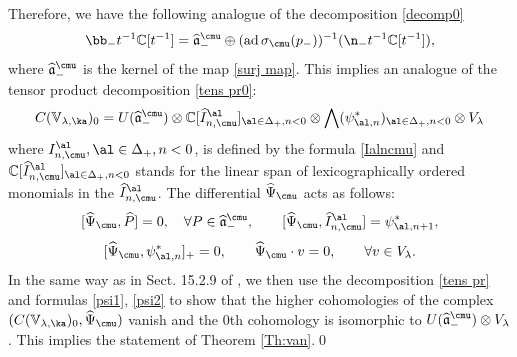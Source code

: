 \documentclass{amsart}
\newcommand{\wh}{\widehat}
\newcommand{\on}{\operatorname}
\newcommand{\+}{\mathop{\oplus}}
\renewcommand{\*}{{\otimes}}
\newcommand{\mf}{\mathfrak}
\newcommand{\mb}{\mathbb}
\newcommand{\C}{\mathbb{C}}
\newcommand{\ra}{\rightarrow}
\newcommand{\lam}{\lambda}
\DeclareMathOperator{\ad}{ad}
\theoremstyle{theorem}
\theoremstyle{remark}
\numberwithin{equation}{section}
\begin{document}
Therefore, we have the following analogue of the decomposition
\eqref{decomp0}
\begin{equation}    \label{decomp}
\bb_- t^{-1}\C[t^{-1}] = \wh{\mathfrak a}^\cmu_- \oplus (\on{ad}
\sigma_\cmu(p_-))^{-1}(\n_- t^{-1} \C[t^{-1}]),
\end{equation}
where $\wh{\mathfrak a}^\cmu_-$ is the kernel of the map \eqref{surj
  map}. This implies an analogue of the tensor product decomposition
\eqref{tens pr0}:
\begin{equation}    \label{tens pr}
C({\mb V}_{\lam,\ka})_0 =
  U(\wh{\mathfrak a}^\cmu_-) \otimes \C[\wh{I}^\al_{n,\cmu}]_{\al \in
    \Delta_+, n<0} \otimes \bigwedge(\psi^*_{\al,n})_{\al \in
    \Delta_+, n<0} \otimes V_\lam
\end{equation}
where $I^\al_{n,\cmu}, \al \in \Delta_+, n<0$, is defined by the
formula \eqref{Ialncmu} and $\C[\wh{I}^\al_{n,\cmu}]_{\al \in
  \Delta_+, n<0}$ stands for the linear span of lexicographically
ordered monomials in the $\wh{I}^\al_{n,\cmu}$. The differential
$\wh\Psi_\cmu$ acts as follows:
\begin{equation}    \label{psi1}
[\wh\Psi_\cmu,\wh{P}] = 0, \quad \forall P \in \wh{\mathfrak
  a}^\cmu_-,
\qquad [\wh\Psi_\cmu,\wh{I}^{\al}_{n,\cmu}] = \psi^*_{\al,n+1},
\end{equation}
\begin{equation}    \label{psi2}
[\wh\Psi_\cmu,\psi^*_{\al,n}]_+=0, \qquad \wh\Psi_\cmu \cdot v = 0,
\qquad \forall v \in V_\lam.
\end{equation}
In the same way as in Sect. 15.2.9 of \cite{FreBen04}, we then use the
decomposition \eqref{tens pr} and formulas \eqref{psi1}, \eqref{psi2}
to show that the higher cohomologies of the complex $(C({\mb
  V}_{\lam,\ka})_0,\wh\Psi_\cmu)$ vanish and the $0$th cohomology is
isomorphic to $U(\wh{\mathfrak a}^\cmu_-) \otimes V_\lam$. This
implies the statement of Theorem \ref{Th:van}.\qed


\end{document}
